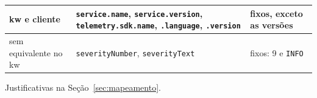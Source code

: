 \begin{table}[!ht]
\begin{threeparttable}
\begin{tabular}{@{}>{\raggedright\arraybackslash}p{4.0cm}
                      >{\raggedright\arraybackslash}p{5.0cm}
                      >{\raggedright\arraybackslash}p{5.2cm}@{}}
      kw e cliente
        & \texttt{service.name}, \texttt{service.version},
          \texttt{telemetry.sdk.name}, \texttt{.language}, \texttt{.version}
        & fixos, exceto as versões \\
      \midrule
      sem equivalente no kw & \texttt{severityNumber}, \texttt{severityText}
        & fixos: 9 e \texttt{INFO} \\
      \bottomrule
    \end{tabular}
    \begin{tablenotes}
      \footnotesize
      \item Justificativas na Seção~\ref{sec:mapeamento}.
    \end{tablenotes}
  \end{threeparttable}
\end{table}
